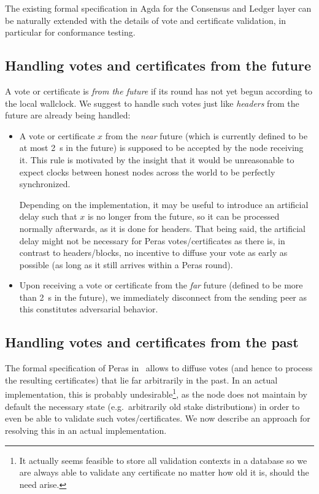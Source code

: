 The existing formal specification in Agda for the Consensus and Ledger layer \parencite{consensus-spec,cardano-formal-ledger-specs} can be naturally extended with the details of vote and certificate validation, in particular for conformance testing.

\subsection{Handling votes and certificates from the future}\label{sec:votes certs from the future}

A vote or certificate is \emph{from the future} if its round has not yet begun according to the local wallclock.
We suggest to handle such votes just like \emph{headers} from the future are already being handled:
\begin{itemize}
\item
  A vote or certificate $x$ from the \emph{near} future (which is currently defined to be at most \qty{2}{\s} in the future) is supposed to be accepted by the node receiving it.
  This rule is motivated by the insight that it would be unreasonable to expect clocks between honest nodes across the world to be perfectly synchronized.

  Depending on the implementation, it may be useful to introduce an artificial delay such that $x$ is no longer from the future, so it can be processed normally afterwards, as it is done for headers. That being said, the artificial delay might not be necessary for Peras votes/certificates as there is, in contrast to headers/blocks, no incentive to diffuse your vote as early as possible (as long as it still arrives within a Peras round).
\item
  Upon receiving a vote or certificate from the \emph{far} future (defined to be more than \qty{2}{\s} in the future), we immediately disconnect from the sending peer as this constitutes adversarial behavior. %
\end{itemize}

\subsection{Handling votes and certificates from the past}\label{sec:votes certs from the past}

The formal specification of Peras in~\cite{peras-cip,badertscher2025peras} allows to diffuse votes (and hence to process the resulting certificates) that lie far arbitrarily in the past.
In an actual implementation, this is probably undesirable\footnote{It actually seems feasible to store all validation contexts in a database so we are always able to validate any certificate no matter how old it is, should the need arise.}, as the node does not maintain by default the necessary state (e.g.\ arbitrarily old stake distributions) in order to even be able to validate such votes/certificates.
We now describe an approach for resolving this in an actual implementation.

